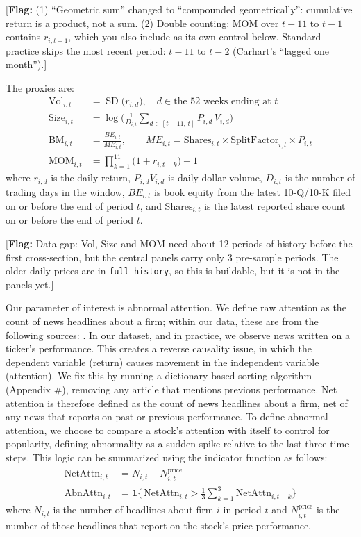 \documentclass[11pt]{article}
\newcommand{\flag}[1]{{\color{red!75!black}\small [\textbf{Flag:} #1]}}
\begin{document}
\flag{(1) ``Geometric sum'' changed to ``compounded geometrically'': cumulative return is a product, not a sum. (2) Double counting: MOM over $t-11$ to $t-1$ contains $r_{i,t-1}$, which you also include as its own control below. Standard practice skips the most recent period: $t-11$ to $t-2$ (Carhart's ``lagged one month'').}

The proxies are:
\begin{align}
\text{Vol}_{i,t} &= \operatorname{SD}\big(r_{i,d}\big), \quad d \in \text{the 52 weeks ending at } t \\
\text{Size}_{i,t} &= \log\!\Big(\frac{1}{D_{i,t}}\sum_{d \in [t-11,\,t]} P_{i,d}\,V_{i,d}\Big) \\
\text{BM}_{i,t} &= \frac{BE_{i,t}}{ME_{i,t}}, \qquad ME_{i,t} = \text{Shares}_{i,t} \times \text{SplitFactor}_{i,t} \times P_{i,t} \\
\text{MOM}_{i,t} &= \prod_{k=1}^{11}\big(1 + r_{i,t-k}\big) - 1
\end{align}
where $r_{i,d}$ is the daily return, $P_{i,d}V_{i,d}$ is daily dollar volume, $D_{i,t}$ is the number of trading days in the window, $BE_{i,t}$ is book equity from the latest 10-Q/10-K filed on or before the end of period $t$, and $\text{Shares}_{i,t}$ is the latest reported share count on or before the end of period $t$.

\flag{Data gap: Vol, Size and MOM need about 12 periods of history before the first cross-section, but the central panels carry only 3 pre-sample periods. The older daily prices are in \texttt{full\_history}, so this is buildable, but it is not in the panels yet.}

Our parameter of interest is abnormal attention. We define raw attention as the count of news headlines about a firm; within our data, these are from the following sources: \underline{\hspace{4cm}}. In our dataset, and in practice, we observe news written on a ticker's performance. This creates a reverse causality issue, in which the dependent variable (return) causes movement in the independent variable (attention). We fix this by running a dictionary-based sorting algorithm (Appendix \#), removing any article that mentions previous performance. Net attention is therefore defined as the count of news headlines about a firm, net of any news that reports on past or previous performance. To define abnormal attention, we choose to compare a stock's attention with itself to control for popularity, defining abnormality as a sudden spike relative to the last three time steps. This logic can be summarized using the indicator function as follows:
\begin{align}
\text{NetAttn}_{i,t} &= N_{i,t} - N^{\text{price}}_{i,t} \\
\text{AbnAttn}_{i,t} &= \mathbf{1}\Big\{\, \text{NetAttn}_{i,t} > \frac{1}{3}\sum_{k=1}^{3}\text{NetAttn}_{i,t-k} \Big\}
\end{align}
where $N_{i,t}$ is the number of headlines about firm $i$ in period $t$ and $N^{\text{price}}_{i,t}$ is the number of those headlines that report on the stock's price performance.
\end{document}

